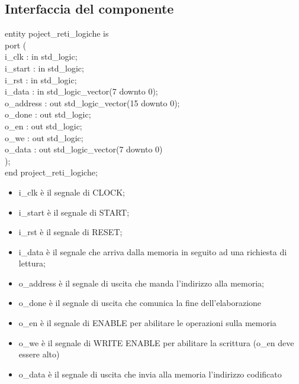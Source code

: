 \documentclass{article}
\newcommand\tab[1][1cm]{\hspace*{#1}}
\begin{document}
\subsection{Interfaccia del componente}
{\selectfont
entity poject\_reti\_logiche is\\
\tab port (\\
\tab\tab i\_clk\hspace*{1,5cm} : in std\_logic;\\
\tab\tab i\_start\hspace*{1,1cm} : in std\_logic;\\
\tab\tab i\_rst\hspace*{1,5cm} : in std\_logic;\\
\tab\tab i\_data\hspace*{1,3cm} : in std\_logic\_vector(7 downto 0);\\
\tab\tab o\_address\hspace*{0,7cm} : out std\_logic\_vector(15 downto 0);\\
\tab\tab o\_done\hspace*{1,3cm} : out std\_logic;\\
\tab\tab o\_en\hspace*{1,7cm} : out std\_logic;\\
\tab\tab o\_we\hspace*{1,7cm} : out std\_logic;\\
\tab\tab o\_data\hspace*{1,3cm} : out std\_logic\_vector(7 downto 0)\\
\tab );\\
end project\_reti\_logiche;
}
\begin{itemize}
\vspace{5mm} %
\item i\_clk è il segnale di CLOCK;
\item i\_start è il segnale di START;
\item i\_rst è il segnale di RESET;
\item i\_data è il segnale che arriva dalla memoria in seguito ad una richiesta di lettura;
\item o\_address è il segnale di uscita che manda l'indirizzo alla memoria;
\item o\_done è il segnale di uscita che comunica la fine dell'elaborazione
\item o\_en è il segnale di ENABLE per abilitare le operazioni sulla memoria
\item o\_we è il segnale di WRITE ENABLE per abilitare la scrittura ({\selectfont o\_en} deve essere alto)
\item o\_data è il segnale di uscita che invia alla memoria l'indirizzo codificato
\end{itemize}
\pagebreak
\end{document}
